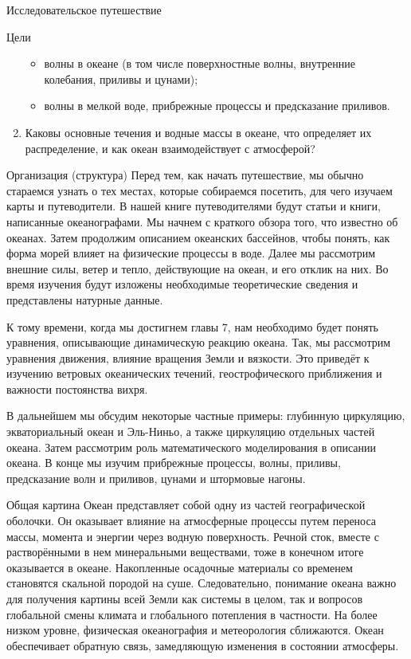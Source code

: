 \begin{chapter}{Исследовательское путешествие}
\begin{section}{Цели}
\begin{enumerate}
\begin{itemize}
  \item
  волны в океане (в том числе поверхностные волны, внутренние колебания, 
  приливы и цунами); 

  \item
  волны в мелкой воде, прибрежные процессы и предсказание приливов.
\end{itemize}

\item
Каковы основные течения и водные массы в океане, что определяет их 
распределение, и как океан взаимодействует с атмосферой?
\end{enumerate}
\end{section}

\begin{section}{Организация (структура)}
Перед тем, как начать путешествие, мы обычно стараемся узнать о тех местах, 
которые собираемся посетить, для чего изучаем карты и путеводители. 
В нашей книге путеводителями будут статьи и книги, написанные океанографами. 
Мы начнем с краткого обзора того, что известно об океанах. 
Затем продолжим описанием океанских бассейнов, чтобы понять, как форма 
морей влияет на физические процессы в воде. Далее мы рассмотрим внешние силы, 
ветер и тепло, действующие на океан, и его отклик на них. Во время изучения 
будут изложены необходимые теоретические сведения и представлены натурные 
данные.

К тому времени, когда мы достигнем главы 7, нам необходимо будет понять 
уравнения, описывающие динамическую реакцию океана. Так, мы рассмотрим 
уравнения движения, влияние вращения Земли и вязкости. Это приведёт к 
изучению ветровых океанических течений, геострофического приближения и важности 
постоянства вихря.

В дальнейшем мы обсудим некоторые частные примеры: глубинную циркуляцию, 
экваториальный океан и Эль-Ниньо, а также циркуляцию отдельных частей океана. 
Затем рассмотрим роль математического моделирования в описании океана. 
В конце мы изучим прибрежные процессы, волны, приливы, предсказание волн 
и приливов, цунами и штормовые нагоны.
\end{section}

\begin{section}{Общая картина}
Океан представляет собой одну из частей географической оболочки. 
Он оказывает влияние на атмосферные процессы путем переноса массы, момента и
энергии через водную поверхность. Речной сток, вместе с растворёнными в нем
минеральными веществами, тоже в конечном итоге оказывается в океане. 
Накопленные осадочные материалы со временем становятся скальной
породой на суше. Следовательно, понимание океана важно для получения картины 
всей Земли как системы в целом, так и вопросов глобальной смены климата и
глобального потепления в частности. На более низком уровне, физическая 
океанография и метеорология сближаются. Океан обеспечивает обратную связь,
замедляющую изменения в состоянии атмосферы.


\end{section}
\end{chapter}
